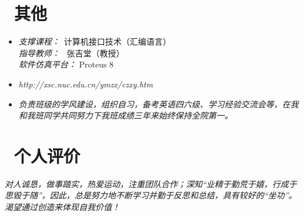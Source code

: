 \documentclass{resume}
\begin{document}
\section{\faHeartO\ 其他}
\begin{itemize}[parsep=0.5ex]
  \item {}
    \textit{\large{支撑课程：}}\ 计算机接口技术（汇编语言） \\
    \textit{\large{指导教师：}} \ 张吉堂（教授）\\
    \textit{\large{软件仿真平台：}} Proteus 8
  \item {}
    \textit{http://xsc.nuc.edu.cn/ymzx/czxy.htm}
  \item {}
        \textit{负责班级的学风建设，组织自习，备考英语四六级、学习经验交流会等，在我和我班同学共同努力下我班成绩三年来始终保持全院第一。}
\end{itemize}

%
%

\section{\faFlag \ 个人评价}
 \textit{\qquad 对人诚恳，做事踏实，热爱运动，注重团队合作；深知“业精于勤荒于嬉，行成于思毁于随”，因此，总是努力地不断学习并勤于反思和总结，具有较好的“坐功”。渴望通过创造来体现自我价值！}
\end{document}
